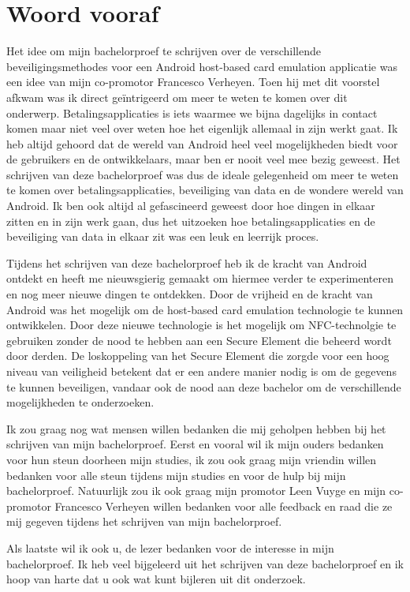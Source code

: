 
\chapter*{Woord vooraf}
\label{ch:voorwoord}


Het idee om mijn bachelorproef te schrijven over de verschillende beveiligingsmethodes voor een Android host-based card emulation applicatie was een idee van mijn co-promotor Francesco Verheyen. Toen hij met dit voorstel afkwam was ik direct geïntrigeerd om meer te weten te komen over dit onderwerp. Betalingsapplicaties is iets waarmee we bijna dagelijks in contact komen maar niet veel over weten hoe het eigenlijk allemaal in zijn werkt gaat. Ik heb altijd gehoord dat de wereld van Android heel veel mogelijkheden biedt voor de gebruikers en de ontwikkelaars, maar ben er nooit veel mee bezig geweest. Het schrijven van deze bachelorproef was dus de ideale gelegenheid om meer te weten te komen over betalingsapplicaties, beveiliging van data en de wondere wereld van Android. Ik ben ook altijd al gefascineerd geweest door hoe dingen in elkaar zitten en in zijn werk gaan, dus het uitzoeken hoe betalingsapplicaties en de beveiliging van data in elkaar zit was een leuk en leerrijk proces. 

Tijdens het schrijven van deze bachelorproef heb ik de kracht van Android ontdekt en heeft me nieuwsgierig gemaakt om hiermee verder te experimenteren en nog meer nieuwe dingen te ontdekken. Door de vrijheid en de kracht van Android was het mogelijk om de host-based card emulation technologie te kunnen ontwikkelen. Door deze nieuwe technologie is het mogelijk om NFC-technolgie te gebruiken zonder de nood te hebben aan een Secure Element die beheerd wordt door derden. De loskoppeling van het Secure Element die zorgde voor een hoog niveau van veiligheid betekent dat er een andere manier nodig is om de gegevens te kunnen beveiligen, vandaar ook de nood aan deze bachelor om de verschillende mogelijkheden te onderzoeken.  

Ik zou graag nog wat mensen willen bedanken die mij geholpen hebben bij het schrijven van mijn bachelorproef. Eerst en vooral wil ik mijn ouders bedanken voor hun steun doorheen mijn studies, ik zou ook graag mijn vriendin willen bedanken voor alle steun tijdens mijn studies en voor de hulp bij mijn bachelorproef. Natuurlijk zou ik ook graag mijn promotor Leen Vuyge en mijn co-promotor Francesco Verheyen willen bedanken voor alle feedback en raad die ze mij gegeven tijdens het schrijven van mijn bachelorproef. 

Als laatste wil ik ook u, de lezer bedanken voor de interesse in mijn bachelorproef. Ik heb veel bijgeleerd uit het schrijven van deze bachelorproef en ik hoop van harte dat u ook wat kunt bijleren uit dit onderzoek. 